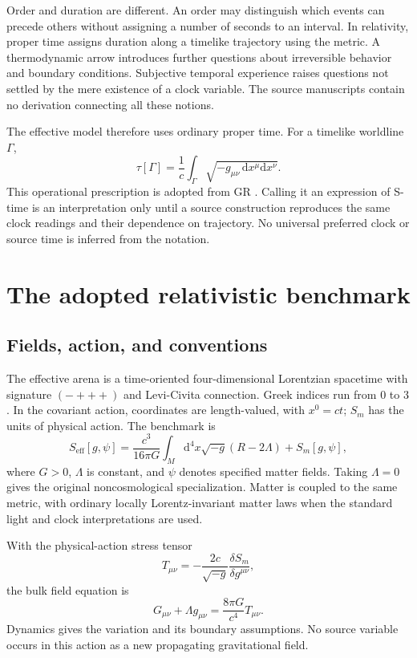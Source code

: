 \documentclass[11pt,oneside]{report}
\newcommand{\dd}{\mathrm d}
\theoremstyle{remark}
\numberwithin{definition}{chapter}
\numberwithin{proposition}{chapter}
\numberwithin{remark}{chapter}
\begin{document}
Order and duration are different. An order may distinguish which events can precede others without assigning a number of seconds to an interval. In relativity, proper time assigns duration along a timelike trajectory using the metric. A thermodynamic arrow introduces further questions about irreversible behavior and boundary conditions. Subjective temporal experience raises questions not settled by the mere existence of a clock variable. The source manuscripts contain no derivation connecting all these notions.

The effective model therefore uses ordinary proper time. For a timelike worldline $\Gamma$,
\begin{equation}
\tau[\Gamma]=\frac{1}{c}\int_\Gamma
\sqrt{-g_{\mu\nu}\,\dd x^\mu\dd x^\nu}.
\label{foundations:eq:propertime}
\end{equation}
This operational prescription is adopted from GR \parencite{Carroll1997}. Calling it an expression of S-time is an interpretation only until a source construction reproduces the same clock readings and their dependence on trajectory. No universal preferred clock or source time is inferred from the notation.

\section{The adopted relativistic benchmark}
\subsection{Fields, action, and conventions}
The effective arena is a time-oriented four-dimensional Lorentzian spacetime with signature $(-+++)$ and Levi-Civita connection. Greek indices run from $0$ to $3$. In the covariant action, coordinates are length-valued, with $x^0=ct$; $S_m$ has the units of physical action. The benchmark is
\begin{equation}
S_{\mathrm{eff}}[g,\psi]=\frac{c^3}{16\pi G}
\int_M\dd^4x\sqrt{-g}(R-2\Lambda)+S_m[g,\psi],
\label{foundations:eq:SA}
\end{equation}
where $G>0$, $\Lambda$ is constant, and $\psi$ denotes specified matter fields. Taking $\Lambda=0$ gives the original noncosmological specialization. Matter is coupled to the same metric, with ordinary locally Lorentz-invariant matter laws when the standard light and clock interpretations are used.

With the physical-action stress tensor
\begin{equation}
T_{\mu\nu}=-\frac{2c}{\sqrt{-g}}\frac{\delta S_m}{\delta g^{\mu\nu}},
\end{equation}
the bulk field equation is
\begin{equation}
G_{\mu\nu}+\Lambda g_{\mu\nu}=\frac{8\pi G}{c^4}T_{\mu\nu}.
\label{foundations:eq:einstein}
\end{equation}
Dynamics gives the variation and its boundary assumptions. No source variable occurs in this action as a new propagating gravitational field.
\end{document}
